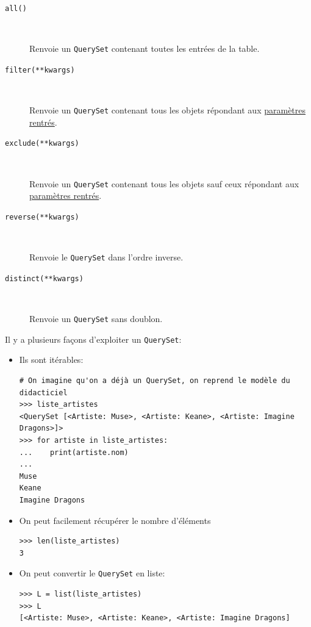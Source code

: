 \documentclass[a4paper, 10pt]{article}
\newcommand{\code}[1]{{\small\texttt{#1}}}
\begin{document}
{\begin{description}
    \item[\texttt{all()}]~

    Renvoie un \code{QuerySet} contenant toutes les entrées de la table.

    \item[\texttt{filter(**kwargs)}]~

    Renvoie un \code{QuerySet} contenant tous les objets répondant aux \href{https://docs.djangoproject.com/fr/2.0/ref/models/querysets/#field-lookups}{paramètres rentrés}.

    \item[\texttt{exclude(**kwargs)}]~

    Renvoie un \code{QuerySet} contenant tous les objets sauf ceux répondant aux \href{https://docs.djangoproject.com/fr/2.0/ref/models/querysets/#field-lookups}{paramètres rentrés}.

    \item[\texttt{reverse(**kwargs)}]~

    Renvoie le \code{QuerySet} dans l'ordre inverse.

    \item[\texttt{distinct(**kwargs)}]~

    Renvoie un \code{QuerySet} sans doublon.
\end{description}

Il y a plusieurs façons d'exploiter un \code{QuerySet}:
\begin{itemize}
    \item Ils sont itérables:
    \begin{verbatim}
# On imagine qu'on a déjà un QuerySet, on reprend le modèle du didacticiel
>>> liste_artistes
<QuerySet [<Artiste: Muse>, <Artiste: Keane>, <Artiste: Imagine Dragons>]>
>>> for artiste in liste_artistes:
...    print(artiste.nom)
...
Muse
Keane
Imagine Dragons
    \end{verbatim}

    \item On peut facilement récupérer le nombre d'éléments
    \begin{verbatim}
>>> len(liste_artistes)
3
    \end{verbatim}

    \item On peut convertir le \code{QuerySet} en liste:
    \begin{verbatim}
>>> L = list(liste_artistes)
>>> L
[<Artiste: Muse>, <Artiste: Keane>, <Artiste: Imagine Dragons]
    \end{verbatim}


\end{itemize}}
\end{document}
